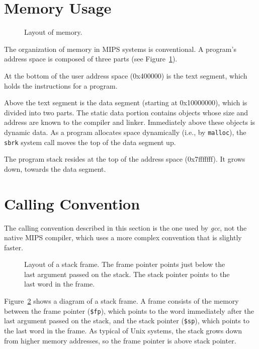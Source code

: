 \documentclass[11pt]{article}
\begin{document}
\section{Memory Usage}

\begin{figure}
  \centerline{}
  \caption{Layout of memory.}
  \label{fig:mem}
\end{figure}
The organization of memory in MIPS systems is conventional.  A
program's address space is composed of three parts (see
Figure~\ref{fig:mem}).

At the bottom of the user address space (0x400000) is the text
segment, which holds the instructions for a program.

Above the text segment is the data segment (starting at 0x10000000),
which is divided into two parts.  The static data portion contains
objects whose size and address are known to the compiler and linker.
Immediately above these objects is dynamic data.  As a program
allocates space dynamically (i.e., by {\tt malloc}), the {\tt sbrk}
system call moves the top of the data segment up.

The program stack resides at the top of the address space
(0x7fffffff).  It grows down, towards the data segment.

\section{Calling Convention}

The calling convention described in this section is the one used by
{\em gcc\/}, not the native MIPS compiler, which uses a more complex
convention that is slightly faster.

\begin{figure}
  \centerline{}
  \caption{Layout of a stack frame.  The frame pointer points just
below the last argument passed on the stack.  The stack pointer points
to the last word in the frame.}
  \label{fig:stack}
\end{figure}
Figure~\ref{fig:stack} shows a diagram of a stack frame.  A frame
consists of the memory between the frame pointer ({\tt \$fp}), which
points to the word immediately after the last argument passed on the
stack, and the stack pointer ({\tt \$sp}), which points to the last
word in the frame.  As typical of Unix systems, the stack grows
down from higher memory addresses, so the frame pointer is above stack
pointer.
\end{document}
